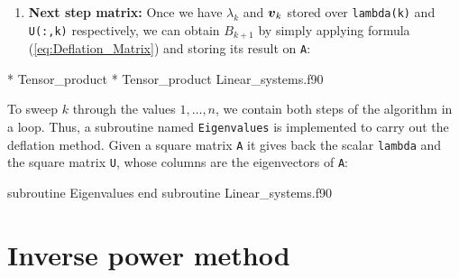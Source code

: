      \begin{enumerate}[resume]
     	\item \textbf{Next step matrix:} Once we have $\lambda_{k}$ and $\boldsymbol{v}_{k}$ stored over \verb|lambda(k)| and \verb|U(:,k)| respectively, we can obtain $B_{k+1}$ by simply applying formula (\ref{eq:Deflation_Matrix}) and storing its result on \verb|A|:
     \end{enumerate}
     \vspace{0.5cm} 
     {* Tensor_product}
     {* Tensor_product}
     {Linear_systems.f90}
     
     
     
     To sweep $k$ through the values $1,\ldots, n$, we contain both steps of the algorithm in a loop. Thus, a subroutine named \verb|Eigenvalues| is implemented to carry out the deflation method. Given a square matrix \verb|A| it gives back the scalar \verb|lambda| and the square matrix \verb|U|, whose columns are the eigenvectors of \verb|A|:
     
     \newpage
     \vspace{0.5cm} 
     {subroutine Eigenvalues}
     {end subroutine}
     {Linear_systems.f90}
    
 \section{Inverse power method}
     
